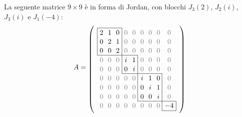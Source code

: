 \begin{example}
La seguente matrice $9\times 9$  è in forma di Jordan, con blocchi $J_3\left(2\right)$, $J_2\left(i\right)$, $J_3\left(i\right)$ e $J_1\left(-4\right)$:
	\begin{equation*}
		A=
		\tikz[baseline]{%
			\node[matrix of math nodes,matrix anchor=west,left delimiter=(,right delimiter=),ampersand replacement=\&] (M) {%
				2 	\& 1 	\& 0	\& \color{gray}{0}	\&	\color{gray}{0} 	\&	\color{gray}{0} 	\&	\color{gray}{0} 	\&	\color{gray}{0} 	\&	\color{gray}{0} 	\\
				0	\& 2 	\& 1 	\& \color{gray}{0}	\&	\color{gray}{0}	\&	 \color{gray}{0}	\&	\color{gray}{0} 	\&	\color{gray}{0} 	\&	\color{gray}{0} 	\\
				0	\& 0 	\& 2 	\& \color{gray}{0}	\& \color{gray}{0}	\&	\color{gray}{0}	\&	\color{gray}{0} 	\&	\color{gray}{0} 	\&	\color{gray}{0} 	\\
				\color{gray}{0}	\& \color{gray}{0} 	\& \color{gray}{0}  	\& i	\& 1	\&	\color{gray}{0}	\&	\color{gray}{0} 	\&	\color{gray}{0} 	\&	\color{gray}{0} 	\\
				\color{gray}{0}	\& \color{gray}{0} 	\& \color{gray}{0} 	\& 0	\& i	\&	\color{gray}{0}	\&	\color{gray}{0}	\&	\color{gray}{0}	\&	\color{gray}{0}	\\
				\color{gray}{0}	\&  \color{gray}{0}	\& \color{gray}{0} 	\& \color{gray}{0}	\& \color{gray}{0}	\&	i	\&	1	\&	0	\&	\color{gray}{0}	\\
				\color{gray}{0}	\& \color{gray}{0} 	\& \color{gray}{0}  	\& 	\color{gray}{0}	\& \color{gray}{0}	\&	0	\&	i	\&	1 	\&	\color{gray}{0}	\\
				\color{gray}{0}	\&  \color{gray}{0}	\&  \color{gray}{0} 	\& \color{gray}{0}		\& \color{gray}{0}	\&	0	\&	0	\&	i 	\&	\color{gray}{0}	\\
				\color{gray}{0}	\& \color{gray}{0} 	\&  \color{gray}{0} 	\& \color{gray}{0}		\& \color{gray}{0}	\&	\color{gray}{0}	\&	\color{gray}{0}	\&	\color{gray}{0} 	\&	-4	\\				
			};
			\draw (M-1-1.north west) rectangle (M-3-3.south east);
			\draw (M-3-3.south east) rectangle (M-5-5.south east);
			\draw (M-5-5.south east) rectangle (M-8-8.south east);
			\draw (M-8-8.south east) rectangle (M-9-9.south east);
		}
	\end{equation*}
\end{example}

